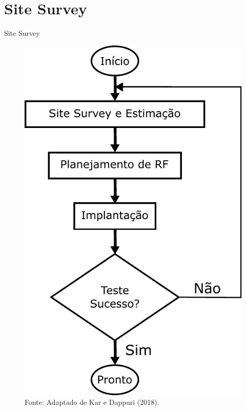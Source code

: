 \documentclass[aspectratio=169,12pt]{beamer}
\begin{document}
\section{Site Survey}
\begin{frame}{Site Survey}
	\begin{figure}[H]
		\centering
		\includegraphics[scale=.45]{fig_tcc/fluxograma_site_survey_01.pdf}
		\caption*{{\footnotesize Fonte: Adaptado de Kar e Dappuri (2018).}}
	\end{figure}
\end{frame}
\end{document}
